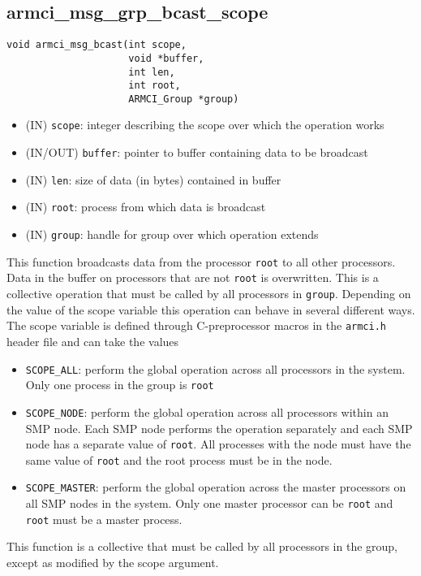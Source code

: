 \documentclass[12pt]{article}
\begin{document}
\subsection{armci\_msg\_grp\_bcast\_scope}
\begin{verbatim}
void armci_msg_bcast(int scope,
                     void *buffer,
                     int len,
                     int root,
                     ARMCI_Group *group)
\end{verbatim}
\begin{itemize}
\item (IN) \texttt{scope}: integer describing the scope over which the operation
works
\item (IN/OUT) \texttt{buffer}: pointer to buffer containing data to be broadcast
\item (IN) \texttt{len}: size of data (in bytes) contained in buffer
\item (IN) \texttt{root}: process from which data is broadcast
\item (IN) \texttt{group}: handle for group over which operation extends
\end{itemize}
This function broadcasts data from the processor \texttt{root} to all other
processors. Data in the buffer on processors that are not \texttt{root} is
overwritten. This is a collective operation that must be called by all
processors in \texttt{group}. Depending on the value of the scope variable
this operation can behave in several different ways.  The scope variable is
defined through C-preprocessor macros in the \texttt{armci.h} header file and can
take the values
\begin{itemize}
\item \texttt{SCOPE\_ALL}: perform the global operation across all processors in
the system. Only one process in the group is \texttt{root}
\item \texttt{SCOPE\_NODE}: perform the global operation across all processors
within an SMP node. Each SMP node performs the operation separately and each SMP
node has a separate value of \texttt{root}. All processes with the node must
have the same value of \texttt{root} and the root process must be in the node.
\item \texttt{SCOPE\_MASTER}: perform the global operation across the master
processors on all SMP nodes in the system. Only one master processor can be
\texttt{root} and \texttt{root} must be a master process.
\end{itemize}
This function is a collective that must be called by all processors in the
group, except as modified by the scope argument.
\end{document}
